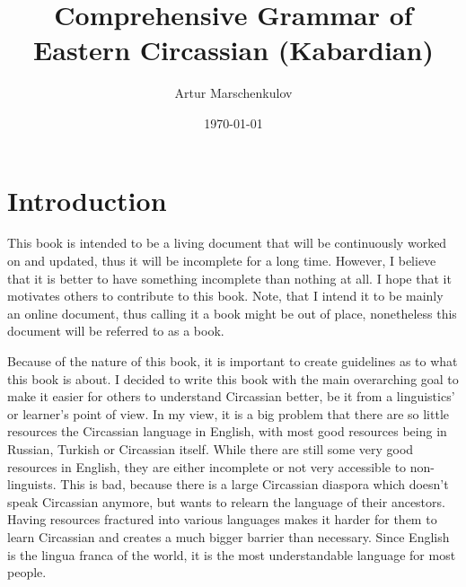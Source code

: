 \documentclass[a4paper, 10pt]{book}
\begin{document}
\title{Comprehensive Grammar of Eastern Circassian (Kabardian)}
\author{Artur Marschenkulov}
\date{\today}


\newcommand{\mywordcre}[3]{\textbf{#1} \textit{#2} `{#3}'}
\newcommand{\mywordcr}[2]{\textbf{#1} \textit{#2}}
\newcommand{\myworde}[1]{`{#1}'}



\maketitle

\tableofcontents


\chapter{Introduction}
This book is intended to be a living document that will be continuously worked on and updated, thus it will be incomplete for a long time. However, I believe that it is better to have something incomplete than nothing at all. I hope that it motivates others to contribute to this book. Note, that I intend it to be mainly an online document, thus calling it a book might be out of place, nonetheless this document will be referred to as a book. 

Because of the nature of this book, it is important to create guidelines as to what this book is about. I decided to write this book with the main overarching goal to make it easier for others to understand Circassian better, be it from a linguistics' or learner's point of view. In my view, it is a big problem that there are so little resources the Circassian language in English, with most good resources being in Russian, Turkish or Circassian itself. While there are still some very good resources in English, they are either incomplete or not very accessible to non-linguists. This is bad, because there is a large Circassian diaspora which doesn't speak Circassian anymore, but wants to relearn the language of their ancestors. Having resources fractured into various languages makes it harder for them to learn Circassian and creates a much bigger barrier than necessary. Since English is the lingua franca of the world, it is the most understandable language for most people.
\end{document}
